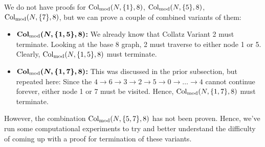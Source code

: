 We do not have proofs for $\mathrm{Col}_{\text{mod}}(N,\{1\},8)$, $\mathrm{Col}_{\text{mod}}(N,\{5\},8)$, $\mathrm{Col}_{\text{mod}}(N,\{7\},8)$, but we can prove a couple of combined variants of them:
\begin{itemize}
    \item \textbf{$\boldsymbol{\mathrm{Col}_{\text{mod}}(N,\{1,5\},8)}$:} We already know that Collatz Variant 2 must terminate. Looking at the base 8 graph, 2 must traverse to either node 1 or 5. Clearly, $\mathrm{Col}_{\text{mod}}(N,\{1,5\},8)$ must terminate.
    \item \textbf{$\boldsymbol{\mathrm{Col}_{\text{mod}}(N,\{1,7\},8)}$:} This was discussed in the prior subsection, but repeated here: Since the $4 \rightarrow 6 \rightarrow 3 \rightarrow 2 \rightarrow 5 \rightarrow 0 \rightarrow \ldots \rightarrow 4$ cannot continue forever, either node 1 or 7 must be visited. Hence, $\mathrm{Col}_{\text{mod}}(N,\{1,7\},8)$ must terminate.
\end{itemize}
However, the combination $\mathrm{Col}_{\text{mod}}(N,\{5,7\},8)$ has not been proven. Hence, we've run some computational experiments to try and better understand the difficulty of coming up with a proof for termination of these variants. 
